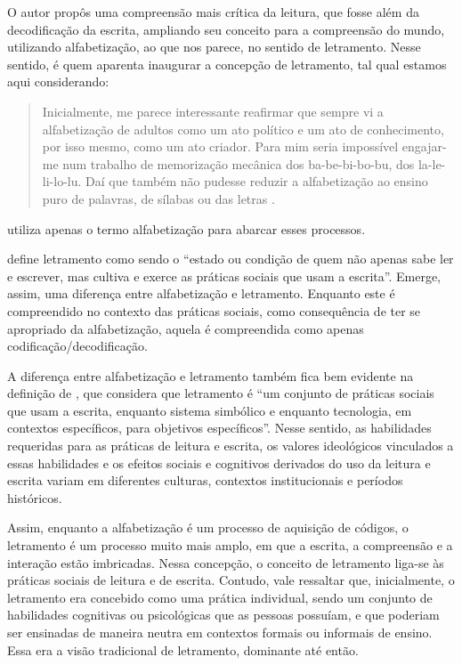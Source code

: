 \documentclass{textolivre}
\begin{document}
O autor propôs uma compreensão mais crítica da leitura, que fosse além da
decodificação da escrita, ampliando seu conceito para a compreensão do mundo,
utilizando alfabetização, ao que nos parece, no sentido de letramento. Nesse
sentido, \textcite{freire1989} é quem aparenta inaugurar a concepção de letramento, tal
qual estamos aqui considerando:
\begin{quote}
Inicialmente, me parece interessante reafirmar que sempre vi a alfabetização de
adultos como um ato político e um ato de conhecimento, por isso mesmo, como um
ato criador. Para mim seria impossível engajar-me num trabalho de memorização
mecânica dos ba-be-bi-bo-bu, dos la-le-li-lo-lu. Daí que também não pudesse
reduzir a alfabetização ao ensino puro de palavras, de sílabas ou das letras
\cite[p. 13]{freire1989}.
\end{quote}

\textcite{freire1989} utiliza apenas o termo alfabetização para abarcar esses processos.

\textcite[. 47]{soares2004} define letramento como sendo o “estado ou condição
de quem não apenas sabe ler e escrever, mas cultiva e exerce as práticas
sociais que usam a escrita”. Emerge, assim, uma diferença entre alfabetização e
letramento. Enquanto este é compreendido no contexto das práticas sociais, como
consequência de ter se apropriado da alfabetização, aquela é compreendida como
apenas codificação/decodificação.

A diferença entre alfabetização e letramento também fica bem evidente na
definição de \textcite[p. 19]{kleiman2003}, que considera que letramento é “um conjunto
de práticas sociais que usam a escrita, enquanto sistema simbólico e enquanto
tecnologia, em contextos específicos, para objetivos específicos”. Nesse
sentido, as habilidades requeridas para as práticas de leitura e escrita, os
valores ideológicos vinculados a essas habilidades e os efeitos sociais e
cognitivos derivados do uso da leitura e escrita variam em diferentes culturas,
contextos institucionais e períodos históricos.

Assim, enquanto a alfabetização é um processo de aquisição de códigos, o
letramento é um processo muito mais amplo, em que a escrita, a compreensão e a
interação estão imbricadas. Nessa concepção, o conceito de letramento liga-se
às práticas sociais de leitura e de escrita. Contudo, vale ressaltar que,
inicialmente, o letramento era concebido como uma prática individual, sendo um
conjunto de habilidades cognitivas ou psicológicas que as pessoas possuíam, e
que poderiam ser ensinadas de maneira neutra em contextos formais ou informais
de ensino. Essa era a visão tradicional de letramento, dominante até então.
\end{document}
